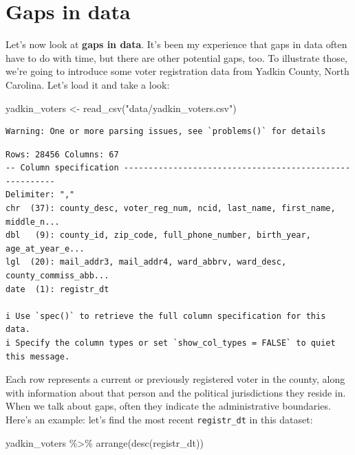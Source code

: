 \documentclass[
  letterpaper,
  DIV=11,
  numbers=noendperiod]{scrreprt}
\newenvironment{Shaded}{\begin{snugshade}}{\end{snugshade}}
\newcommand{\FunctionTok}[1]{\textcolor[rgb]{0.28,0.35,0.67}{#1}}
\newcommand{\NormalTok}[1]{\textcolor[rgb]{0.00,0.23,0.31}{#1}}
\newcommand{\OtherTok}[1]{\textcolor[rgb]{0.00,0.23,0.31}{#1}}
\newcommand{\SpecialCharTok}[1]{\textcolor[rgb]{0.37,0.37,0.37}{#1}}
\newcommand{\StringTok}[1]{\textcolor[rgb]{0.13,0.47,0.30}{#1}}
\begin{document}
\hypertarget{gaps-in-data}{%
\section{Gaps in data}\label{gaps-in-data}}

Let's now look at \textbf{gaps in data}. It's been my experience that
gaps in data often have to do with time, but there are other potential
gaps, too. To illustrate those, we're going to introduce some voter
registration data from Yadkin County, North Carolina. Let's load it and
take a look:

\begin{Shaded}
\begin{Highlighting}[]
\NormalTok{yadkin\_voters }\OtherTok{\textless{}{-}} \FunctionTok{read\_csv}\NormalTok{(}\StringTok{"data/yadkin\_voters.csv"}\NormalTok{)}
\end{Highlighting}
\end{Shaded}

\begin{verbatim}
Warning: One or more parsing issues, see `problems()` for details
\end{verbatim}

\begin{verbatim}
Rows: 28456 Columns: 67
-- Column specification --------------------------------------------------------
Delimiter: ","
chr  (37): county_desc, voter_reg_num, ncid, last_name, first_name, middle_n...
dbl   (9): county_id, zip_code, full_phone_number, birth_year, age_at_year_e...
lgl  (20): mail_addr3, mail_addr4, ward_abbrv, ward_desc, county_commiss_abb...
date  (1): registr_dt

i Use `spec()` to retrieve the full column specification for this data.
i Specify the column types or set `show_col_types = FALSE` to quiet this message.
\end{verbatim}

Each row represents a current or previously registered voter in the
county, along with information about that person and the political
jurisdictions they reside in. When we talk about gaps, often they
indicate the administrative boundaries. Here's an example: let's find
the most recent \texttt{registr\_dt} in this dataset:

\begin{Shaded}
\begin{Highlighting}[]
\NormalTok{yadkin\_voters }\SpecialCharTok{\%\textgreater{}\%} \FunctionTok{arrange}\NormalTok{(}\FunctionTok{desc}\NormalTok{(registr\_dt))}
\end{Highlighting}
\end{Shaded}
\end{document}
